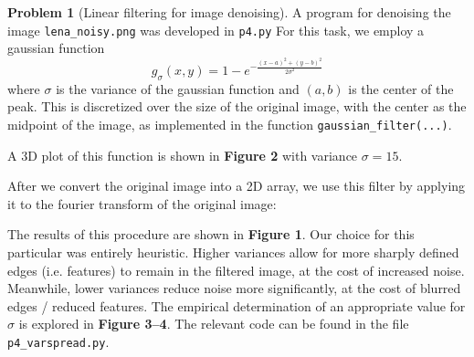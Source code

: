 \documentclass[10pt]{article}
\theoremstyle{plain}
\theoremstyle{definition}
\newtheorem{prob}{Problem}
\numberwithin{equation}{section}
\begin{document}
\hrulefill
\newpage
\begin{prob}[Linear filtering for image denoising]
    A program for denoising the image \texttt{lena\_noisy.png} was developed in \texttt{p4.py}
    For this task, we employ a gaussian function
    \[
        g_\sigma(x,y) = 1 - e^{-\frac{(x-a)^2 + (y-b)^2}{2\sigma^2}}
    \]
    where $\sigma $ is the variance of the gaussian function and $(a,b)$ is the center of the peak.
    This is discretized over the size of the original image, with the center as the midpoint of the
    image, as implemented in the function \texttt{gaussian\_filter(...)}.
    
    A 3D plot of this function is shown in \textbf{Figure 2} with variance $\sigma=15$.
    
    \newpage

    After we convert the original image into a 2D array, we use this filter by applying it
    to the fourier transform of the original image:
    
    
    The results of this procedure are shown in \textbf{Figure 1}. Our choice for this particular
    was entirely heuristic. Higher variances allow for more sharply defined edges (i.e. features) to
    remain in the filtered image, at the cost of increased noise. Meanwhile,
    lower variances reduce noise more significantly, at the cost of blurred edges / reduced features.
    The empirical determination of an appropriate value for $\sigma$ is explored in
    \textbf{Figure 3--4}. The relevant code can be found in the file \texttt{p4\_varspread.py}.


\end{prob}
\end{document}
